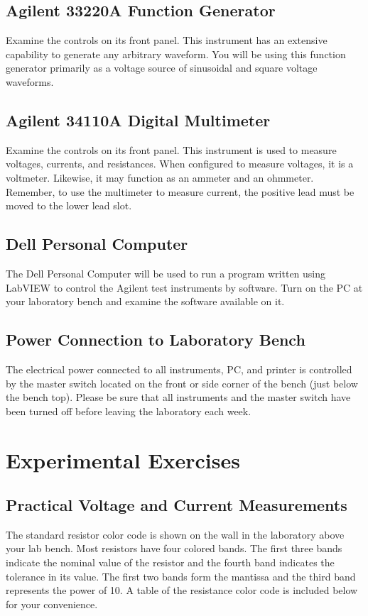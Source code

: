 \documentclass[12pt]{../manual}
\begin{document}
\subsection{Agilent 33220A Function Generator}
Examine the controls on its front panel. This instrument has an extensive capability to generate any arbitrary waveform. You will be using this function generator primarily as a voltage source of sinusoidal and square voltage waveforms. 

\subsection{Agilent 34110A Digital Multimeter}
Examine the controls on its front panel. This instrument is used to measure voltages, currents, and resistances. When configured to measure voltages, it is a voltmeter. Likewise, it may function as an ammeter and an ohmmeter. Remember, to use the multimeter to measure current, the positive lead must be moved to the lower lead slot. 

\subsection{Dell Personal Computer}
The Dell Personal Computer will be used to run a program written using LabVIEW to control the Agilent test instruments by software. Turn on the PC at your laboratory bench and examine the software available on it. 
 
\subsection{Power Connection to Laboratory Bench}
The electrical power connected to all instruments, PC, and printer is controlled by the master switch located on the front or side corner of the bench (just below the bench top). Please be sure that all instruments and the master switch have been turned off before leaving the laboratory each week.

\section{Experimental Exercises}
\subsection{Practical Voltage and Current Measurements}
The standard resistor color code is shown on the wall in the laboratory above your lab bench. Most resistors have four colored bands. The first three bands indicate the nominal value of the resistor and the fourth band indicates the tolerance in its value. The first two bands form the mantissa and the third band represents the power of 10. A table of the resistance color code is included below for your convenience.
\end{document}
